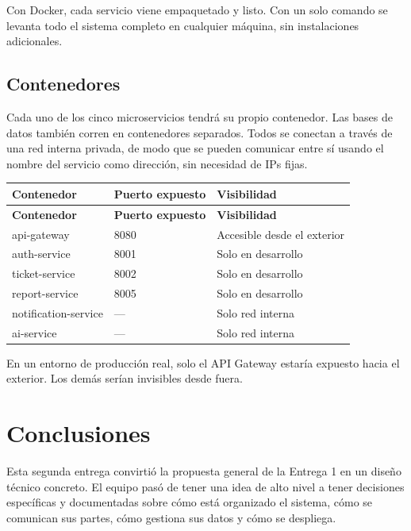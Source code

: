 \documentclass[12pt, a4paper]{report}
\begin{document}
Con Docker, cada servicio viene empaquetado y listo. Con un solo
comando se levanta todo el sistema completo en cualquier máquina,
sin instalaciones adicionales.

\section{Contenedores}

Cada uno de los cinco microservicios tendrá su propio contenedor.
Las bases de datos también corren en contenedores separados.
Todos se conectan a través de una red interna privada, de modo que
se pueden comunicar entre sí usando el nombre del servicio como
dirección, sin necesidad de IPs fijas.
\newpage

\begin{longtable}{|p{4.5cm}|p{3cm}|p{5cm}|}
\hline
\textbf{Contenedor} & \textbf{Puerto expuesto} & \textbf{Visibilidad} \\
\hline
\endfirsthead
\hline
\textbf{Contenedor} & \textbf{Puerto expuesto} & \textbf{Visibilidad} \\
\hline
\endhead
api-gateway          & 8080 & Accesible desde el exterior \\
\hline
auth-service         & 8001 & Solo en desarrollo \\
\hline
ticket-service       & 8002 & Solo en desarrollo \\
\hline
report-service       & 8005 & Solo en desarrollo \\
\hline
notification-service & ---  & Solo red interna \\
\hline
ai-service           & ---  & Solo red interna \\
\hline
\end{longtable}

En un entorno de producción real, solo el API Gateway estaría
expuesto hacia el exterior. Los demás serían invisibles desde fuera.


\newpage

\chapter{Conclusiones}

Esta segunda entrega convirtió la propuesta general de la Entrega 1
en un diseño técnico concreto. El equipo pasó de tener una idea de
alto nivel a tener decisiones específicas y documentadas sobre cómo
está organizado el sistema, cómo se comunican sus partes, cómo
gestiona sus datos y cómo se despliega.
\end{document}

